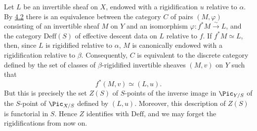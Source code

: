 Let $L$ be an invertible sheaf on $X$, endowed with a rigidification $u$
relative to $\alpha$. By \hyperlink{sga6.e12.lem.4-2}{4.2} there is an equivalence between the category
$C$ of pairs $(M,\varphi)$ consisting of an invertible sheaf $M$ on $Y$ and
an isomorphism $\varphi:f^*M\xrightarrow{\sim}L$, and the category
$\mathrm{Deff}(S)$ of effective descent data on $L$ relative to $f$.
If $f^*M\simeq L$, then, since $L$ is rigidified relative to $\alpha$, $M$
is canonically endowed with a rigidification relative to $\beta$.
Consequently, $C$ is equivalent to the discrete category defined by the set
of classes of $\beta$-rigidified invertible sheaves $(M,v)$ on $Y$ such that
\[
  f^*(M,v)\simeq(L,u).
\]
But this is precisely the set $Z(S)$ of $S$-points of the inverse image in
$\Pic_{Y/S}$ of the $S$-point of $\Pic_{X/S}$ defined by $(L,u)$. Moreover,
this description of $Z(S)$ is functorial in $S$. Hence $Z$ identifies with
$\mathrm{Deff}$, and we may forget the rigidifications from now on.

